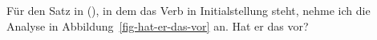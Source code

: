 Für den Satz in (), in dem das Verb in Initialstellung steht, nehme ich die Analyse in 
Abbildung~\vref{fig-hat-er-das-vor} an.
\ea
Hat er das vor?
\z
\begin{figure}[htb]

\end{figure}
